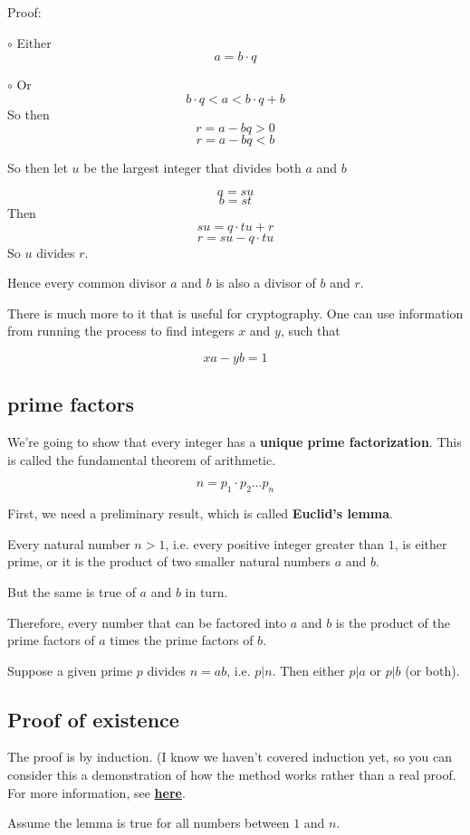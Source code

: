 \documentclass[11pt, oneside]{article}
\begin{document}
Proof:

$\circ$ Either 
\[ a = b \cdot q \]

$\circ$ Or
\[ b \cdot q < a < b \cdot q + b \]
So then
\[ r = a - bq > 0 \]
\[ r = a - bq < b \]

So then let $u$ be the largest integer that divides both $a$ and $b$

\[ a = su \]
\[ b = st \]
Then 
\[ su = q \cdot tu + r \]
\[ r = su - q \cdot tu \]
So $u$ divides $r$.

Hence every common divisor $a$ and $b$ is also a divisor of $b$ and $r$.

There is much more to it that is useful for cryptography.  One can use information from running the process to find integers $x$ and $y$, such that

\[ xa - yb = 1 \]

\subsection*{prime factors}

We're going to show that every integer has a \textbf{unique prime factorization}.  This is called the fundamental theorem of arithmetic.

\[ n = p_1 \cdot p_2 \dots p_n \]

First, we need a preliminary result, which is called \textbf{Euclid's lemma}.

Every natural number $n > 1$, i.e. every positive integer greater than $1$, is either prime, or it is the product of two smaller natural numbers $a$ and $b$.

But the same is true of $a$ and $b$ in turn.

Therefore, every number that can be factored into $a$ and $b$ is the product of the prime factors of $a$ times the prime factors of $b$.  

Suppose a given prime $p$ divides $n = ab$, i.e. $p|n$. Then either $p|a$ or  $p|b$ (or both).

\subsection*{Proof of existence}

The proof is by induction.  (I know we haven't covered induction yet, so you can consider this a demonstration of how the method works rather than a real proof.   For more information, see \hyperref[sec:induction]{\textbf{here}}.

Assume the lemma is true for all numbers between $1$ and $n$.  
\end{document}
